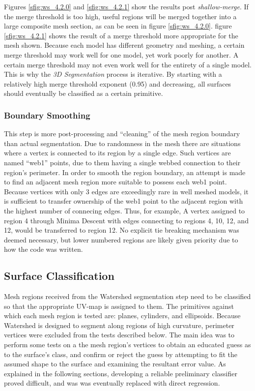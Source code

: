 Figures \ref{sfig:ws_4.2.0} and \ref{sfig:ws_4.2.1} show the results post \textit{shallow-merge}.
If the merge threshold is too high, useful regions will be merged together into a large composite mesh section, as can be seen in figure \ref{sfig:ws_4.2.0}.
figure \ref{sfig:ws_4.2.1} shows the result of a merge threshold more appropriate for the mesh shown.
Because each model has different geometry and meshing, a certain merge threshold may work well for one model, yet work poorly for another.
A certain merge threshold may not even work well for the entirety of a single model.
This is why the \textit{3D Segmentation} process is iterative.
By starting with a relatively high merge threshold exponent (0.95) and decreasing, all surfaces should eventually be classified as a certain primitive.

\subsubsection{Boundary Smoothing}
This step is more post-processing and ``cleaning'' of the mesh region boundary than actual segmentation.
Due to randomness in the mesh there are situations where a vertex is connected to its region by a single edge.
Such vertices are named ``web1'' points, due to them having a single webbed connection to their region's perimeter.
In order to smooth the region boundary, an attempt is made to find an adjacent mesh region more suitable to possess each web1 point.
Because vertices with only 3 edges are exceedingly rare in well meshed models, it is sufficient to transfer ownership of the web1 point to the adjacent region with the highest number of connecing edges.
Thus, for example, A vertex assigned to region 4 through Minima Descent with edges connecting to regions 4, 10, 12, and 12, would be transferred to region 12.
No explicit tie breaking mechanism was deemed necessary, but lower numbered regions are likely given priority due to how the code was written.


\subsection{Surface Classification}
Mesh regions received from the Watershed segmentation step need to be classified so that the appropriate UV-map is assigned to them.
The primitives against which each mesh region is tested are: planes, cylinders, and ellipsoids.
Because Watershed is designed to segment along regions of high curvature, perimeter vertices were excluded from the tests described below.
The main idea was to perform some tests on a the mesh region's vertices to obtain an educated guess as to the surface's class, and confirm or reject the guess by attempting to fit the assumed shape to the surface and examining the resultant error value.
As explained in the following sections, developing a reliable preliminary classifier proved difficult, and was was eventually replaced with direct regression.

